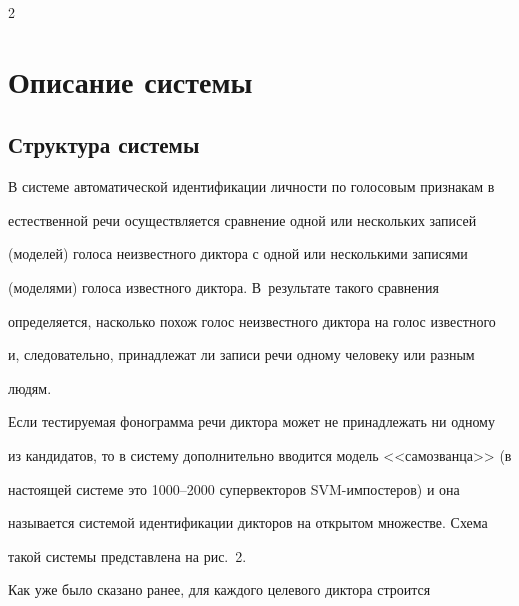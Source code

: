 \begin{multicols}{2}
\begin{table}
\end{table}





\section{Описание системы}











\subsection{Структура системы} %


  


  В системе автоматической идентификации личности по голосовым признакам в 


естественной \mbox{речи} осуществляется сравнение одной или нескольких записей 


(моделей) голоса неизвестного диктора с одной или несколькими записями 


(моделями) голоса известного диктора. В~результате такого сравнения 


определяется, насколько похож голос неизвестного диктора на голос известного 


и, следовательно, принадлежат ли записи речи одному человеку или разным 


людям.


  


  Если тестируемая фонограмма речи диктора может не принадлежать ни одному 


из кандидатов, то в систему дополнительно вводится модель <<самозванца>> (в 


настоящей системе это 1000--2000 супервекторов SVM-им\-пос\-те\-ров) и она 


называется системой идентификации дикторов на открытом множестве. Схема 


такой системы представлена на рис.~2.


  





  


  Как уже было сказано ранее, для каждого целевого диктора строится 



\end{multicols}
